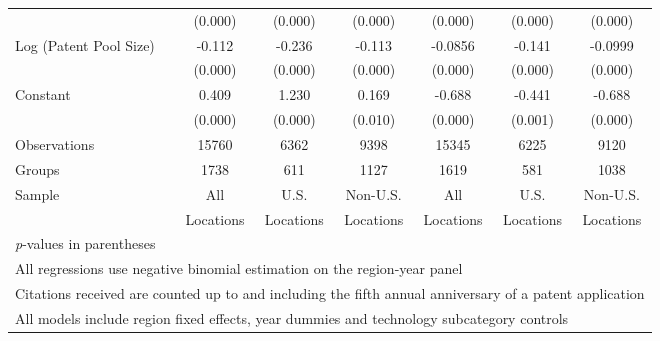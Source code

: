 \documentclass[12pt,letterpaper]{article}
\begin{document}
\begin{table}[htbp]
\begin{tabular}{l*{6}{c}}
                &  (0.000)&  (0.000)&  (0.000)&  (0.000)&  (0.000)&  (0.000)\\
Log (Patent Pool Size)&   -0.112&   -0.236&   -0.113&  -0.0856&   -0.141&  -0.0999\\
                &  (0.000)&  (0.000)&  (0.000)&  (0.000)&  (0.000)&  (0.000)\\
Constant        &    0.409&    1.230&    0.169&   -0.688&   -0.441&   -0.688\\
                &  (0.000)&  (0.000)&  (0.010)&  (0.000)&  (0.001)&  (0.000)\\
\hline
Observations    &    15760&     6362&     9398&    15345&     6225&     9120\\
Groups          &     1738&      611&     1127&     1619&      581&     1038\\
Sample&All &U.S. &Non-U.S.&All &U.S. &Non-U.S. \\
          &Locations &Locations&Locations&Locations &Locations&Locations \\
\hline\hline
\multicolumn{7}{l}{\footnotesize \textit{p}-values in parentheses}\\
\multicolumn{7}{l}{\footnotesize All regressions use negative binomial estimation on the region-year panel}\\
\multicolumn{7}{l}{\footnotesize Citations received are counted up to and including the fifth annual anniversary of a patent application}\\
\multicolumn{7}{l}{\footnotesize All models include region fixed effects, year dummies and technology subcategory controls}\\
\end{tabular}
\end{table}
\end{document}
